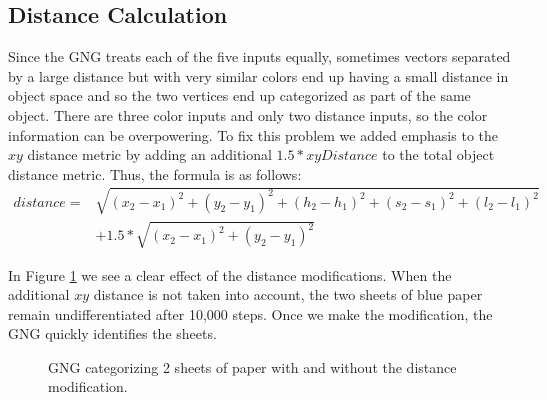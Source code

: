 \documentclass{article}
\renewcommand{\|}{\origbar} %
\begin{document}
\subsection{Distance Calculation}

Since the GNG treats each of the five inputs equally, sometimes vectors separated by a large distance but with very similar colors end up having a small distance in object space and so the two vertices end up categorized as part of the same object. There are three color inputs and only two distance inputs, so the color information can be overpowering. To fix this problem we added emphasis to the $xy$ distance metric by adding an additional $1.5 * xyDistance$ to the total object distance metric. Thus, the formula is as follows:
\begin{align*}
  distance = &\sqrt{(x_2-x_1)^2+(y_2-y_1)^2+(h_2-h_1)^2+(s_2-s_1)^2+(l_2-l_1)^2} \\ &+ 1.5*\sqrt{(x_2-x_1)^2+(y_2-y_1)^2}
\end{align*}

In Figure \ref{fig:distModification} we see a clear effect of the distance modifications. When the additional $xy$ distance is not taken into account, the two sheets of blue paper remain undifferentiated after 10,000 steps. Once we make the modification, the GNG quickly identifies the sheets.

\begin{figure}[h!]
  \centering


  \caption{GNG categorizing 2 sheets of paper with and without the distance modification.}
  \label{fig:distModification}
\end{figure}
\end{document}
